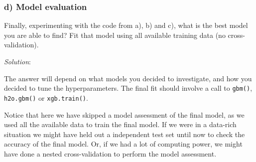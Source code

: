 \documentclass[
]{article}
\newenvironment{Shaded}{\begin{snugshade}}{\end{snugshade}}
\newcommand{\CommentTok}[1]{\textcolor[rgb]{0.56,0.35,0.01}{\textit{#1}}}
\newcommand{\DecValTok}[1]{\textcolor[rgb]{0.00,0.00,0.81}{#1}}
\newcommand{\FunctionTok}[1]{\textcolor[rgb]{0.13,0.29,0.53}{\textbf{#1}}}
\newcommand{\NormalTok}[1]{#1}
\newcommand{\SpecialCharTok}[1]{\textcolor[rgb]{0.81,0.36,0.00}{\textbf{#1}}}
\begin{document}
\begin{Shaded}
\end{Shaded}

\hypertarget{d-model-evaluation}{%
\subsubsection{d) Model evaluation}\label{d-model-evaluation}}

Finally, experimenting with the code from a), b) and c), what is the
best model you are able to find? Fit that model using all available
training data (no cross-validation).

\emph{Solution}:

The answer will depend on what models you decided to investigate, and
how you decided to tune the hyperparameters. The final fit should
involve a call to \texttt{gbm()}, \texttt{h2o.gbm()} or
\texttt{xgb.train()}.

Notice that here we have skipped a model assessment of the final model,
as we used all the available data to train the final model. If we were
in a data-rich situation we might have held out a independent test set
until now to check the accuracy of the final model. Or, if we had a lot
of computing power, we might have done a nested cross-validation to
perform the model assessment.
\end{document}
